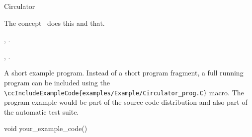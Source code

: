 

\begin{ccRefConcept}{Circulator}


\ccDefinition
  
The concept \ccRefName\ does this and that.

\ccTypes


\ccCreation
{}  %


\ccOperations


\ccHasModels

,
.

\ccSeeAlso

,
.

\ccExample

A short example program.
Instead of a short program fragment, a full running program can be
included using the 
\verb|\ccIncludeExampleCode{examples/Example/Circulator_prog.C}| 
macro. The program example would be part of the source code distribution and
also part of the automatic test suite.

\begin{ccExampleCode}
void your_example_code() {
}
\end{ccExampleCode}


\end{ccRefConcept}


